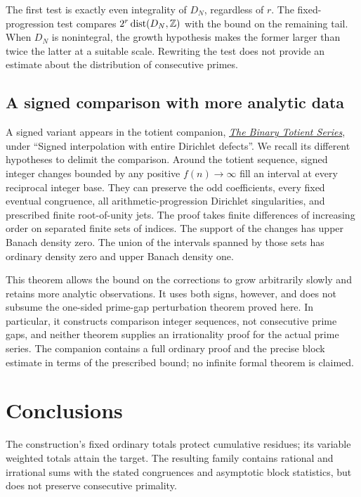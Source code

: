 \documentclass[11pt]{article}
\begin{document}
The first test is exactly even integrality of $D_N$, regardless of $r$.
The fixed-progression test compares $2^r\operatorname{dist}(D_N,\mathbb{Z})$
with the bound on the remaining tail.  When $D_N$ is nonintegral, the
growth hypothesis makes the former larger than twice the latter at a
suitable scale.  Rewriting the
test does not provide an estimate about the distribution of consecutive primes.

\subsection{A signed comparison with more analytic data}
\label{long251:sec:signed-dirichlet-comparison}
A signed variant appears in the totient companion,
\href{https://github.com/wcook04/plectis-erdos/blob/58c4042b103a8263e3a8214a9af20999ff4897a9/paper/249/erdos249-totient-reasoning-surface.pdf}{\emph{The Binary Totient Series}},
under ``Signed interpolation with entire Dirichlet defects''.
We recall its different hypotheses to delimit the comparison. Around the totient sequence,
signed integer changes bounded by any positive $f(n)\to\infty$ fill an
interval at every reciprocal integer base. They can preserve the odd
coefficients, every fixed eventual congruence, all arithmetic-progression
Dirichlet singularities, and prescribed finite root-of-unity jets. The
proof takes finite differences of increasing order on separated finite
sets of indices.  The support of the changes has upper Banach density
zero.  The union of the intervals spanned by those sets has ordinary
density zero and upper Banach density one.

This theorem allows the bound on the corrections to grow arbitrarily slowly and retains more
analytic observations. It uses both signs, however, and does not subsume
the one-sided prime-gap perturbation theorem proved here. In particular,
it constructs comparison integer sequences, not consecutive prime gaps,
and neither theorem supplies an irrationality proof for the actual prime
series. The companion contains a full ordinary proof and the precise
block estimate in terms of the prescribed bound; no infinite formal theorem is claimed.

\section{Conclusions}\label{sec:erdos-251-complete-family-map}
The construction's fixed ordinary totals protect cumulative residues;
its variable weighted totals attain the target.  The resulting family
contains rational and irrational sums with the stated congruences and
asymptotic block statistics, but does not preserve consecutive primality.
\end{document}

